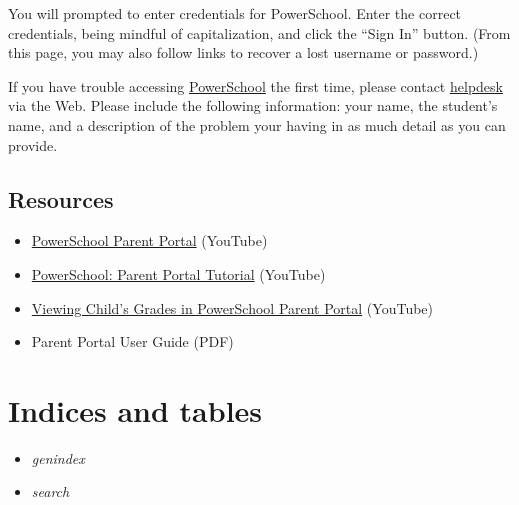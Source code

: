 \documentclass[letterpaper,10pt,english]{sphinxmanual}
\begin{document}
You will prompted to enter credentials for PowerSchool. Enter the correct credentials, being mindful of capitalization, and click the ``Sign In'' button. (From this page, you may also follow links to recover a lost username or password.)

If you have trouble accessing \href{http://chelseaschool.powerschool.com/}{PowerSchool} the first time, please contact \href{http://chelseapride.org/helpdesk}{helpdesk} via the Web. Please include the following information: your name, the student's name, and a description of the problem your having in as much detail as you can provide.


\section{Resources}
\label{powerschool:resources}\begin{itemize}
\item {} 
\href{http://youtu.be/SzF4wF4fglY}{PowerSchool Parent Portal} (YouTube)

\item {} 
\href{http://youtu.be/7z5rOk-89OE}{PowerSchool: Parent Portal Tutorial} (YouTube)

\item {} 
\href{http://youtu.be/YFS0n2D8ri4}{Viewing Child's Grades in PowerSchool Parent Portal} (YouTube)

\item {} 
Parent Portal User Guide (PDF)

\end{itemize}


\chapter{Indices and tables}
\label{Index:indices-and-tables}\label{Index:index-0}\begin{itemize}
\item {} 
\emph{genindex}

\item {} 
\emph{search}

\end{itemize}



\renewcommand{\indexname}{Index}
\printindex
\end{document}
